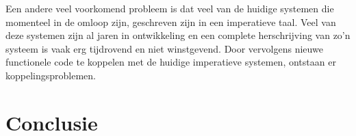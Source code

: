 \documentclass[twoside,twocolumn]{article}
\begin{document}
Een andere veel voorkomend probleem is dat veel van de huidige systemen die
momenteel in de omloop zijn, geschreven zijn in een imperatieve taal. Veel van
deze systemen zijn al jaren in ontwikkeling en een complete herschrijving van
zo'n systeem is vaak erg tijdrovend en niet winstgevend. Door vervolgens nieuwe
functionele code te koppelen met de huidige imperatieve systemen, ontstaan er
koppelingsproblemen.

\section{Conclusie}
\blindtext %





\clearpage



\end{document}
